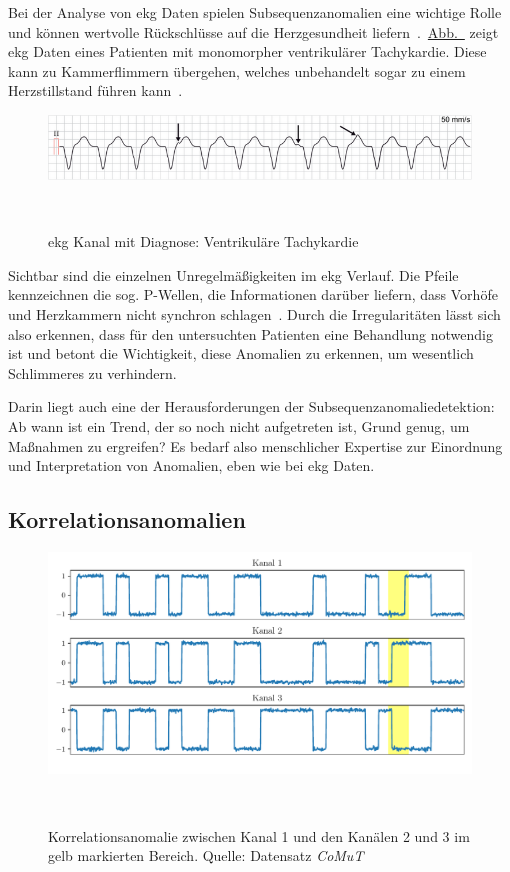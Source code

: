 Bei der Analyse von \ac{ekg} Daten spielen Subsequenzanomalien eine wichtige Rolle und können wertvolle Rückschlüsse auf die Herzgesundheit
liefern~\cite{Chuah2007}.~\hyperref[fig:ekg_herzerkrankung]{Abb.~} zeigt \ac{ekg} Daten eines Patienten mit
monomorpher ventrikulärer Tachykardie. Diese kann zu Kammerflimmern übergehen, welches unbehandelt sogar zu einem Herzstillstand
führen kann~\cite{ekgecho}\Cite[S.~131~ff.]{Davies2015}.

\begin{figure}[h]
    \centering
    \includegraphics[width=0.85\linewidth]{ch4_anomalien/abbildungen/ventrikulaere_tachykardie.png}
    \caption{\ac{ekg} Kanal mit Diagnose: Ventrikuläre Tachykardie~\cite{ekgecho}}
~\label{fig:ekg_herzerkrankung}
\end{figure}

Sichtbar sind die einzelnen Unregelmäßigkeiten im \ac{ekg} Verlauf. Die Pfeile kennzeichnen die sog. P-Wellen, die Informationen darüber
liefern, dass Vorhöfe und Herzkammern nicht synchron schlagen~\cite{ekgecho}\Cite[S.~31~f.]{Davies2015}. Durch die Irregularitäten lässt
sich also erkennen, dass für den untersuchten Patienten eine Behandlung notwendig ist und betont die Wichtigkeit, diese Anomalien zu
erkennen, um wesentlich Schlimmeres zu verhindern.

Darin liegt auch eine der Herausforderungen der Subsequenzanomaliedetektion: Ab wann ist ein Trend, der so noch nicht aufgetreten ist,
Grund genug, um Maßnahmen zu ergreifen? Es bedarf also menschlicher Expertise zur Einordnung und Interpretation von Anomalien, eben wie
bei \ac{ekg} Daten.

\subsection{Korrelationsanomalien}

\begin{figure}[H]
    \centering
    \includegraphics[width=0.95\linewidth]{ch4_anomalien/abbildungen/korrelationsanomalie.pdf}
    \caption{\centering Korrelationsanomalie zwischen Kanal 1 und den Kanälen 2 und 3 im gelb markierten Bereich. Quelle: Datensatz
        \textit{CoMuT}~\cite{NaumannCoMuT}}
~\label{fig:correlation_Anomaly}
\end{figure}

